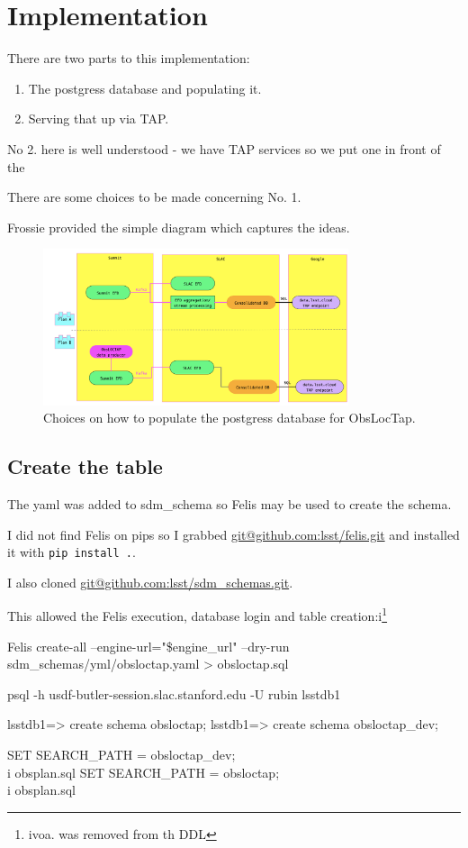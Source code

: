 \section{Implementation}

There are two parts to this implementation:

\begin{enumerate}
\item The postgress database and populating it.
\item Serving that up via TAP.
\end{enumerate}


No 2. here is well understood  - we have TAP services so we put one in front of the \DB

There are some choices to be made concerning No. 1.

Frossie provided the simple diagram  which captures the ideas.


\begin{figure}
\begin{centering}
\includegraphics[width=0.8\textwidth]{obsloctap}
	\caption{ Choices on how to populate the postgress database for ObsLocTap.
\label{fig:obsloctap}}
\end{centering}
\end{figure}


\subsection{Create the table}
The yaml was added to {\code sdm\_schema} so Felis may be used to create the schema.

I did not find Felis on pips so I grabbed \url{git@github.com:lsst/felis.git} and installed it with {\tt pip install .}.

I also cloned \url{git@github.com:lsst/sdm_schemas.git}.

This allowed the Felis execution, database login and table creation:i\footnote{ivoa. was removed  from th DDL} \\
\begin{code}
Felis create-all --engine-url="\$engine\_url" --dry-run  sdm\_schemas/yml/obsloctap.yaml > obsloctap.sql

psql -h usdf-butler-session.slac.stanford.edu -U rubin lsstdb1

lsstdb1=> create schema obsloctap;
lsstdb1=> create schema obsloctap\_dev;

SET SEARCH\_PATH = obsloctap\_dev;
\\i obsplan.sql
SET SEARCH\_PATH = obsloctap;
\\i obsplan.sql

\end{code}

